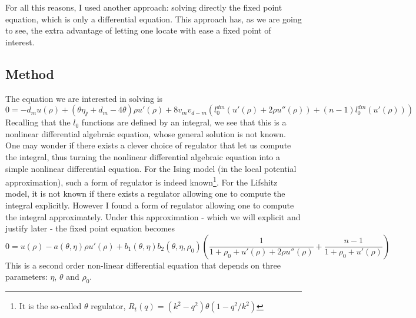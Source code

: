 For all this reasons, I used another approach: solving directly the fixed point equation, which is only a differential equation. This approach has, as we are going to see, the extra advantage of letting one locate with ease a fixed point of interest.

\subsection{Method}
The equation we are interested in solving is 
\begin{equation}
0 = -d_m u(\rho) +(\theta \eta_\sslash + d_m - 4 \theta) \rho u'(\rho) + 8 v_m v_{d-m} \left( l_0^{dm}\left(u'(\rho) + 2 \rho u''(\rho) \right) + (n-1)l_0^{dm}\left(u'(\rho)\right) \right)
\end{equation}
Recalling that the $l_0$ functions are defined by an integral, we see that this is a nonlinear differential algebraic equation, whose general solution is not known. One may wonder if there exists a clever choice of regulator that let us compute the integral, thus turning the nonlinear differential algebraic equation into a simple nonlinear differential equation. 
For the Ising model (in the local potential approximation), such a form of regulator is indeed known\footnote{It is the so-called $\theta$ regulator, $R_t(q)= (k^2-q^2) \theta\left(1-q^2/k^2\right)$}. For the Lifshitz model, it is not known if there exists a regulator allowing one to compute the integral explicitly. However I found a form of regulator allowing one to compute the integral approximately. Under this approximation - which we will explicit and justify later - the fixed point equation becomes
\begin{equation}
\label{eq:u_approx}
0 = u(\rho) - a(\theta, \eta)  \rho u'(\rho) + b_1(\theta, \eta) b_2(\theta, \eta, \rho_0) \left( \frac{1}{1 + \rho_0 + u'(\rho) + 2 \rho u''(\rho)} + \frac{n-1}{1+\rho_0+u'(\rho)} \right)
\end{equation}
This is a second order non-linear differential equation that depends on three parameters: $\eta$, $\theta$ and $\rho_0$.

